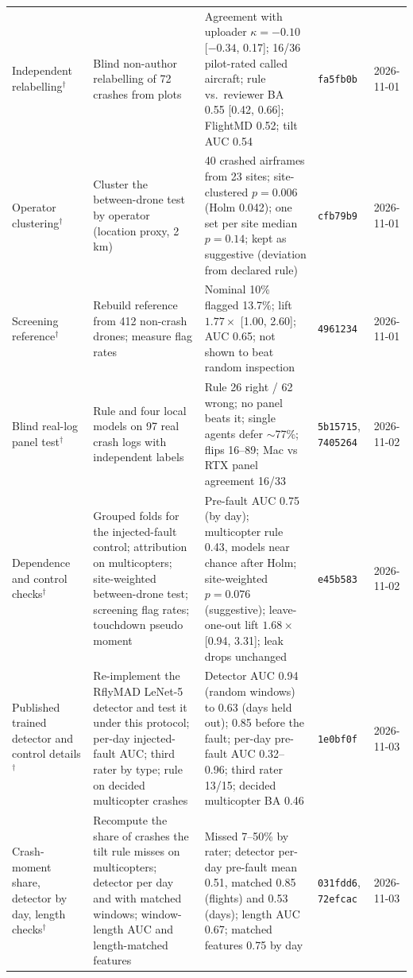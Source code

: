 \documentclass[preprint,12pt]{elsarticle}
\begin{document}
{\begin{longtable}{@{}p{}p{}p{}p{}p{}@{}}
Independent relabelling$^\dagger$ & Blind non-author relabelling of 72 crashes from plots & Agreement with uploader $\kappa=-0.10$ [$-0.34$, 0.17]; 16/36 pilot-rated called aircraft; rule vs.\ reviewer BA 0.55 [0.42, 0.66]; FlightMD 0.52; tilt AUC 0.54 & \texttt{fa5fb0b} & 2026-11-01 \\
Operator clustering$^\dagger$ & Cluster the between-drone test by operator (location proxy, 2\,km) & 40 crashed airframes from 23 sites; site-clustered $p=0.006$ (Holm 0.042); one set per site median $p=0.14$; kept as suggestive (deviation from declared rule) & \texttt{cfb79b9} & 2026-11-01 \\
Screening reference$^\dagger$ & Rebuild reference from 412 non-crash drones; measure flag rates & Nominal 10\% flagged 13.7\%; lift $1.77\times$ [1.00, 2.60]; AUC 0.65; not shown to beat random inspection & \texttt{4961234} & 2026-11-01 \\
Blind real-log panel test$^\dagger$ & Rule and four local models on 97 real crash logs with independent labels & Rule 26 right / 62 wrong; no panel beats it; single agents defer $\sim$77\%; flips 16--89; Mac vs RTX panel agreement 16/33 & \texttt{5b15715}, \texttt{7405264} & 2026-11-02 \\
Dependence and control checks$^\dagger$ & Grouped folds for the injected-fault control; attribution on multicopters; site-weighted between-drone test; screening flag rates; touchdown pseudo moment & Pre-fault AUC 0.75 (by day); multicopter rule 0.43, models near chance after Holm; site-weighted $p=0.076$ (suggestive); leave-one-out lift $1.68\times$ [0.94, 3.31]; leak drops unchanged & \texttt{e45b583} & 2026-11-02 \\
Published trained detector and control details$^\dagger$ & Re-implement the RflyMAD LeNet-5 detector and test it under this protocol; per-day injected-fault AUC; third rater by type; rule on decided multicopter crashes & Detector AUC 0.94 (random windows) to 0.63 (days held out); 0.85 before the fault; per-day pre-fault AUC 0.32--0.96; third rater 13/15; decided multicopter BA 0.46 & \texttt{1e0bf0f} & 2026-11-03 \\
Crash-moment share, detector by day, length checks$^\dagger$ & Recompute the share of crashes the tilt rule misses on multicopters; detector per day and with matched windows; window-length AUC and length-matched features & Missed 7--50\% by rater; detector per-day pre-fault mean 0.51, matched 0.85 (flights) and 0.53 (days); length AUC 0.67; matched features 0.75 by day & \texttt{031fdd6}, \texttt{72efcac} & 2026-11-03 \\

\end{longtable}}
\end{document}
